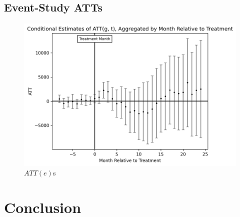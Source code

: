 \documentclass[12pt]{article}
\begin{document}
    \subsection{Event-Study ATTs}
        \begin{figure}[H]
            \centering
            \includegraphics{output/DiD/figures/att_gt_estimates_event_study.png}
            \caption{$ATT(e)$s}
            \label{fig:my_label}
        \end{figure}


\section{Conclusion} \label{sec:conclusion}



\clearpage

\onehalfspacing

%
\end{document}
